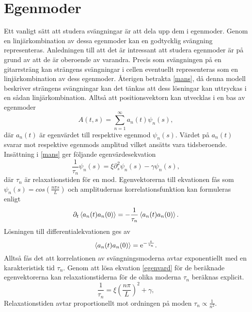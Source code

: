 \section{Egenmoder}
Ett vanligt sätt att studera svängningar är att dela upp dem i egenmoder. Genom en linjärkombination av dessa egenmoder kan en godtycklig svängning representeras. Anledningen till att det är intressant att studera egenmoder är på grund av att de är oberoende av varandra. Precis som  svängningen på en gitarrsträng kan strängens svängningar i cellen eventuellt representeras som en linjärkombination av dess egenmoder. 
Återigen betrakta \eqref{mans}, då denna modell beskriver strängens svängningar kan det tänkas att dess lösningar kan uttryckas i en sådan linjärkombination. Alltså att positionsvektorn kan utvecklas i en bas av egenmoder
\begin{equation}
    A(t,s)=\sum_{n=1}^{\infty}a_{n}(t)\psi_{n}(s),
\end{equation}
där $a_{n}(t)$ är egenvärdet till respektive egenmod $\psi_{n}(s)$. Värdet på $a_{n}(t)$ svarar mot respektive egenmods amplitud vilket ansätts vara tidsberoende. Insättning i \eqref{mans} ger följande egenvärdesekvation \cite{PhysRevE.60.4671}
\begin{equation}\label{egenvard}
    \frac{1}{\tau_{n}}\psi_{n}(s)=\xi\partial_{s}^{2}\psi_{n}(s)-\gamma \psi_{n}(s),
\end{equation}
där $\tau_{n}$ är relaxationstiden för en mod. Egenvektorerna till ekvationen fås som  $\psi_{n}(s)=cos(\frac{n\pi s}{L})$ och amplitudernas korrelationsfunktion kan formuleras enligt
\begin{equation}
    \partial_{t}\ev{a_{n}(t)a_{n}(0)}=-\frac{1}{\tau_{n}}\ev{a_{n}(t)a_{n}(0)}.
\end{equation}
Lösningen till differentialekvationen ges av 
\begin{equation}
    \ev{a_{n}(t)a_{n}(0)}=\ee^{-\frac{t}{\tau_{n}}}.
\end{equation}
Alltså fås det att korrelationen av svängningsmoderna avtar exponentiellt med en karakteristisk tid $\tau_{n}$. Genom att lösa ekvation \eqref{egenvard} för de beräknade egenvektorerna kan relaxationstiderna för de olika moderna $\tau_{n}$ beräknas explicit.
\begin{equation}
    \frac{1}{\tau_{n}}=\xi\left(\frac{n\pi}{L}\right)^{2}+\gamma,
\end{equation}
 Relaxationstiden avtar proportionellt mot ordningen på moden  $\tau_{n}\propto\frac{1}{n^2}$.

